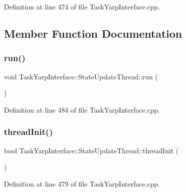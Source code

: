 Definition at line 474 of file Task\+Yarp\+Interface.\+cpp.



\subsection{Member Function Documentation}
\hypertarget{classocra_1_1TaskYarpInterface_1_1StateUpdateThread_ae6be513380cf7cd48fac252379536479}{}\label{classocra_1_1TaskYarpInterface_1_1StateUpdateThread_ae6be513380cf7cd48fac252379536479} 
\subsubsection{\texorpdfstring{run()}{run()}}
{\footnotesize\ttfamily void Task\+Yarp\+Interface\+::\+State\+Update\+Thread\+::run (\begin{DoxyParamCaption}{ }\end{DoxyParamCaption})}



Definition at line 484 of file Task\+Yarp\+Interface.\+cpp.

\hypertarget{classocra_1_1TaskYarpInterface_1_1StateUpdateThread_afb9499707c2ea4b76bb108d74294b1fb}{}\label{classocra_1_1TaskYarpInterface_1_1StateUpdateThread_afb9499707c2ea4b76bb108d74294b1fb} 
\subsubsection{\texorpdfstring{thread\+Init()}{threadInit()}}
{\footnotesize\ttfamily bool Task\+Yarp\+Interface\+::\+State\+Update\+Thread\+::thread\+Init (\begin{DoxyParamCaption}{ }\end{DoxyParamCaption})}



Definition at line 479 of file Task\+Yarp\+Interface.\+cpp.

\hypertarget{classocra_1_1TaskYarpInterface_1_1StateUpdateThread_a77b5d075d27975a99cffad39664df76b}{}\label{classocra_1_1TaskYarpInterface_1_1StateUpdateThread_a77b5d075d27975a99cffad39664df76b} 
